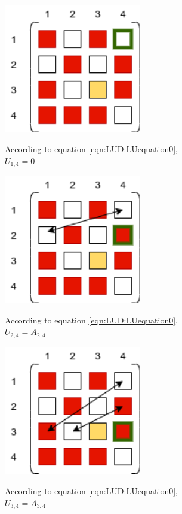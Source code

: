 \begin{minipage}{0.45\textwidth}
\includegraphics[width=0.45\textwidth]{./Scheduler/PpT-Symbolic_A30.png}
\end{minipage}%
\hfill
\begin{minipage}{0.85\textwidth}
According to equation \ref{eqn:LUD:LUequation0},\\
$U_{1,4}=0$
\end{minipage}

\begin{minipage}{0.45\textwidth}
\includegraphics[width=0.45\textwidth]{./Scheduler/PpT-Symbolic_A31.png}
\end{minipage}%
\hfill
\begin{minipage}{0.85\textwidth}
According to equation \ref{eqn:LUD:LUequation0},\\
$U_{2,4}=A_{2,4}$
\end{minipage}

\begin{minipage}{0.45\textwidth}
\includegraphics[width=0.45\textwidth]{./Scheduler/PpT-Symbolic_A32.png}
\end{minipage}%
\hfill
\begin{minipage}{0.85\textwidth}
According to equation \ref{eqn:LUD:LUequation0},\\
$U_{3,4}=A_{3,4}$
\end{minipage}

